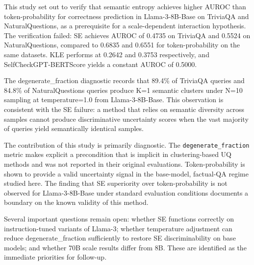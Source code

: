 
This study set out to verify that semantic entropy achieves higher AUROC than token-probability for correctness prediction in Llama-3-8B-Base on TriviaQA and NaturalQuestions, as a prerequisite for a scale-dependent interaction hypothesis. The verification failed: SE achieves AUROC of 0.4735 on TriviaQA and 0.5524 on NaturalQuestions, compared to 0.6835 and 0.6551 for token-probability on the same datasets. KLE performs at 0.2642 and 0.3753 respectively, and SelfCheckGPT-BERTScore yields a constant AUROC of 0.5000.

The degenerate_fraction diagnostic records that 89.4\% of TriviaQA queries and 84.8\% of NaturalQuestions queries produce K=1 semantic clusters under N=10 sampling at temperature=1.0 from Llama-3-8B-Base. This observation is consistent with the SE failure: a method that relies on semantic diversity across samples cannot produce discriminative uncertainty scores when the vast majority of queries yield semantically identical samples.

The contribution of this study is primarily diagnostic. The \texttt{degenerate_fraction} metric makes explicit a precondition that is implicit in clustering-based UQ methods and was not reported in their original evaluations. Token-probability is shown to provide a valid uncertainty signal in the base-model, factual-QA regime studied here. The finding that SE superiority over token-probability is not observed for Llama-3-8B-Base under standard evaluation conditions documents a boundary on the known validity of this method.

Several important questions remain open: whether SE functions correctly on instruction-tuned variants of Llama-3; whether temperature adjustment can reduce degenerate_fraction sufficiently to restore SE discriminability on base models; and whether 70B scale results differ from 8B. These are identified as the immediate priorities for follow-up.


